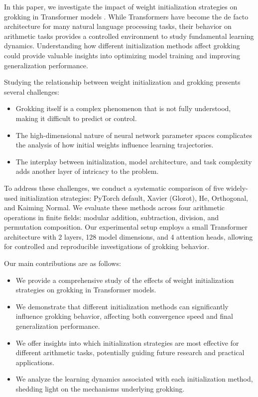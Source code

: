 \documentclass{article} %
\begin{document}
In this paper, we investigate the impact of weight initialization strategies on grokking in Transformer models \cite{vaswani2017attention}. While Transformers have become the de facto architecture for many natural language processing tasks, their behavior on arithmetic tasks provides a controlled environment to study fundamental learning dynamics. Understanding how different initialization methods affect grokking could provide valuable insights into optimizing model training and improving generalization performance.

Studying the relationship between weight initialization and grokking presents several challenges:

\begin{itemize}
    \item Grokking itself is a complex phenomenon that is not fully understood, making it difficult to predict or control.
    \item The high-dimensional nature of neural network parameter spaces complicates the analysis of how initial weights influence learning trajectories.
    \item The interplay between initialization, model architecture, and task complexity adds another layer of intricacy to the problem.
\end{itemize}

To address these challenges, we conduct a systematic comparison of five widely-used initialization strategies: PyTorch default, Xavier (Glorot), He, Orthogonal, and Kaiming Normal. We evaluate these methods across four arithmetic operations in finite fields: modular addition, subtraction, division, and permutation composition. Our experimental setup employs a small Transformer architecture with 2 layers, 128 model dimensions, and 4 attention heads, allowing for controlled and reproducible investigations of grokking behavior.

Our main contributions are as follows:

\begin{itemize}
    \item We provide a comprehensive study of the effects of weight initialization strategies on grokking in Transformer models.
    \item We demonstrate that different initialization methods can significantly influence grokking behavior, affecting both convergence speed and final generalization performance.
    \item We offer insights into which initialization strategies are most effective for different arithmetic tasks, potentially guiding future research and practical applications.
    \item We analyze the learning dynamics associated with each initialization method, shedding light on the mechanisms underlying grokking.
\end{itemize}
\end{document}
